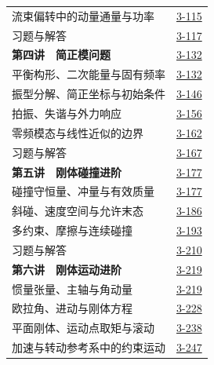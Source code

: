 \begin{longtable}{@{}p{}r@{}}
\hspace{1em}流束偏转中的动量通量与功率&\href{course-page:3:118}{3-115}\\[2pt]
\hspace{1em}习题与解答&\href{course-page:3:120}{3-117}\\[2pt]
\textbf{第四讲　简正模问题}&\href{course-page:3:135}{3-132}\\[2pt]
\hspace{1em}平衡构形、二次能量与固有频率&\href{course-page:3:135}{3-132}\\[2pt]
\hspace{1em}振型分解、简正坐标与初始条件&\href{course-page:3:149}{3-146}\\[2pt]
\hspace{1em}拍振、失谐与外力响应&\href{course-page:3:159}{3-156}\\[2pt]
\hspace{1em}零频模态与线性近似的边界&\href{course-page:3:165}{3-162}\\[2pt]
\hspace{1em}习题与解答&\href{course-page:3:170}{3-167}\\[2pt]
\textbf{第五讲　刚体碰撞进阶}&\href{course-page:3:180}{3-177}\\[2pt]
\hspace{1em}碰撞守恒量、冲量与有效质量&\href{course-page:3:180}{3-177}\\[2pt]
\hspace{1em}斜碰、速度空间与允许末态&\href{course-page:3:189}{3-186}\\[2pt]
\hspace{1em}多约束、摩擦与连续碰撞&\href{course-page:3:196}{3-193}\\[2pt]
\hspace{1em}习题与解答&\href{course-page:3:213}{3-210}\\[2pt]
\textbf{第六讲　刚体运动进阶}&\href{course-page:3:222}{3-219}\\[2pt]
\hspace{1em}惯量张量、主轴与角动量&\href{course-page:3:222}{3-219}\\[2pt]
\hspace{1em}欧拉角、进动与刚体方程&\href{course-page:3:231}{3-228}\\[2pt]
\hspace{1em}平面刚体、运动点取矩与滚动&\href{course-page:3:241}{3-238}\\[2pt]
\hspace{1em}加速与转动参考系中的约束运动&\href{course-page:3:250}{3-247}\\[2pt]

\end{longtable}
